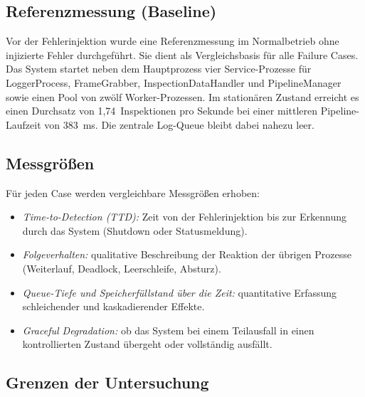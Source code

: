 \subsection{Referenzmessung (Baseline)}
\label{sec:methodik-baseline}

Vor der Fehlerinjektion wurde eine Referenzmessung im Normalbetrieb ohne injizierte Fehler
durchgeführt. Sie dient als Vergleichsbasis für alle Failure Cases. Das System startet
neben dem Hauptprozess vier Service-Prozesse für LoggerProcess, FrameGrabber,
InspectionDataHandler und PipelineManager sowie einen Pool von zwölf Worker-Prozessen. Im
stationären Zustand erreicht es einen Durchsatz von
1,74~Inspektionen pro Sekunde bei einer mittleren Pipeline-Laufzeit von 383~ms. Die
zentrale Log-Queue bleibt dabei nahezu leer.

\subsection{Messgrößen}
\label{sec:methodik-messgroessen}

Für jeden Case werden vergleichbare Messgrößen erhoben:

\begin{itemize}
    \item \textit{Time-to-Detection (TTD):} Zeit von der Fehlerinjektion bis zur
          Erkennung durch das System (Shutdown oder Statusmeldung).
    \item \textit{Folgeverhalten:} qualitative Beschreibung der Reaktion der übrigen
          Prozesse (Weiterlauf, Deadlock, Leerschleife, Absturz).
    \item \textit{Queue-Tiefe und Speicherfüllstand über die Zeit:} quantitative
          Erfassung schleichender und kaskadierender Effekte.
    \item \textit{Graceful Degradation:} ob das System bei einem Teilausfall in einen
          kontrollierten Zustand übergeht oder vollständig ausfällt.
\end{itemize}

\subsection{Grenzen der Untersuchung}
\label{sec:methodik-grenzen}

